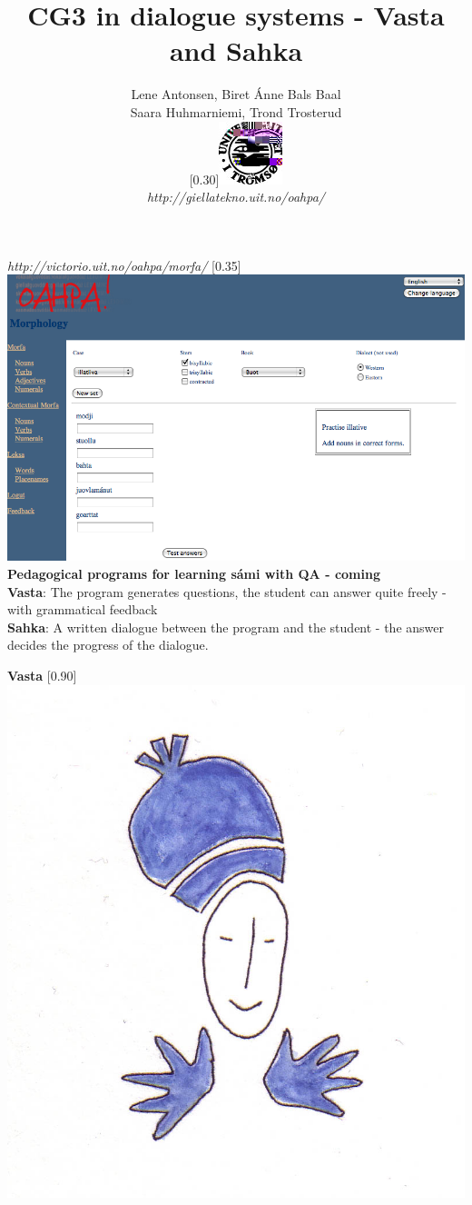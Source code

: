\documentclass[landscape,norsk,11pt]{seminar}
\title{CG3 in dialogue systems - Vasta and Sahka}
\author{Lene Antonsen, Biret Ánne Bals Baal\\
Saara Huhmarniemi, Trond Trosterud \\
 \scalebox{0.30}[0.30]{\includegraphics{img/logoWeb070sh.jpg}} \\
  \textit{http://giellatekno.uit.no/oahpa/}}
\begin{document}
\begin{slide}

\maketitle

\newslide
\textit{http://victorio.uit.no/oahpa/morfa/}
\scalebox{0.35}[0.35]{\includegraphics{img/oahpa.png}} \\


\newslide
\textbf{Pedagogical programs for learning sámi with QA - coming}\\
\newline
\textbf{Vasta}: The program generates questions, the student can answer quite freely - with grammatical feedback \\ \newline
\textbf{Sahka}: A written dialogue between the program and the student - the answer decides the progress of the dialogue.




\newslide
\textbf{Vasta}
\scalebox{0.90}[0.90]{\includegraphics{img/vasta.png}} \\


\end{slide}
\end{document}
